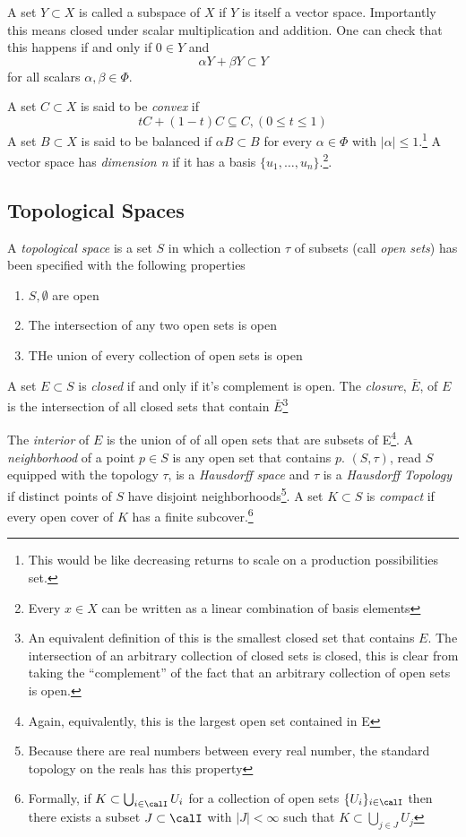 A set $Y \subset X$ is called a subspace of $X$ if $Y$ is itself a vector space. Importantly this means closed under scalar multiplication and addition. One can check that this happens if and only if $0 \in Y$ and 
\[\alpha Y + \beta Y \subset Y\]
for all scalars $\alpha, \beta \in \Phi$.

A set $C \subset X$ is said to be {\it convex} if 
\[tC + (1-t)C \subseteq C, (0 \leq t \leq 1)\]
A set $B \subset X$ is said to be balanced if $\alpha B \subset B$ for every $\alpha \in \Phi$ with $|\alpha|\leq 1$.\footnote{This would be like decreasing returns to scale on a production possibilities set.} A vector space has {\it dimension n} if it has a basis \(\{u_1, \dots, u_n\}\).\footnote{Every $x\in X$ can be written as a linear combination of basis elements}.

\subsection{Topological Spaces}

A {\it topological space} is a set $S$ in which a collection $\tau$ of subsets (call {\it open sets}) has been specified with the following properties 
\begin{enumerate}
	\item $S, \emptyset$ are open
	\item The intersection of any two open sets is open
	\item THe union of every collection of open sets is open 
\end{enumerate}
A set $E \subset S$ is {\it closed} if and only if it's complement is open. The {\it closure}, $\bar{E}$, of $E$ is the intersection of all closed sets that contain $\bar{E}$\footnote{An equivalent definition of this is the smallest closed set that contains $E$. The intersection of an arbitrary collection of closed sets is closed, this is clear from taking the ``complement'' of the fact that an arbitrary collection of open sets is open.}

The \emph{interior} of $E$ is the union of of all open sets that are subsets of E\footnote{Again, equivalently, this is the largest open set contained in E}. A \emph{neighborhood} of a point $p\in S$ is any open set that contains $p$. $(S, \tau)$, read $S$ equipped with the topology $\tau$, is a \emph{Hausdorff space} and $\tau$ is a \emph{Hausdorff Topology} if distinct points of $S$ have disjoint neighborhoods\footnote{Because there are real numbers between every real number, the standard topology on the reals has this property}. A set $K\subset S$ is \emph{compact} if every open cover of $K$ has a finite subcover.\footnote{Formally, if $K \subset \bigcup_{i \in \calI} U_i$ for a collection of open sets $\{U_i\}_{i\in \calI}$ then there exists a subset $J \subset \calI$ with $|J| < \infty$ such that $K \subset \bigcup_{j\in J} U_j$} 

